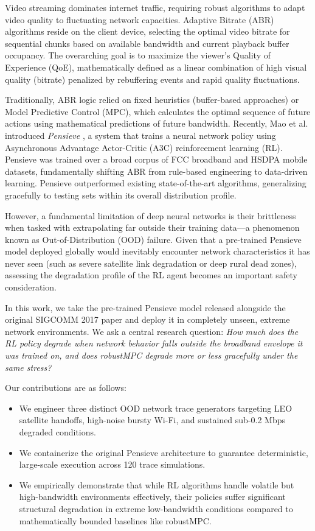 \documentclass[10pt, conference, compsocconf]{IEEEtran}
\begin{document}
Video streaming dominates internet traffic, requiring robust algorithms to adapt video quality to fluctuating network capacities. Adaptive Bitrate (ABR) algorithms reside on the client device, selecting the optimal video bitrate for sequential chunks based on available bandwidth and current playback buffer occupancy. The overarching goal is to maximize the viewer's Quality of Experience (QoE), mathematically defined as a linear combination of high visual quality (bitrate) penalized by rebuffering events and rapid quality fluctuations.

Traditionally, ABR logic relied on fixed heuristics (buffer-based approaches) or Model Predictive Control (MPC), which calculates the optimal sequence of future actions using mathematical predictions of future bandwidth. Recently, Mao et al. introduced \textit{Pensieve} \cite{mao2017neural}, a system that trains a neural network policy using Asynchronous Advantage Actor-Critic (A3C) reinforcement learning (RL). Pensieve was trained over a broad corpus of FCC broadband and HSDPA mobile datasets, fundamentally shifting ABR from rule-based engineering to data-driven learning. Pensieve outperformed existing state-of-the-art algorithms, generalizing gracefully to testing sets within its overall distribution profile.

However, a fundamental limitation of deep neural networks is their brittleness when tasked with extrapolating far outside their training data—a phenomenon known as Out-of-Distribution (OOD) failure. Given that a pre-trained Pensieve model deployed globally would inevitably encounter network characteristics it has never seen (such as severe satellite link degradation or deep rural dead zones), assessing the degradation profile of the RL agent becomes an important safety consideration.

In this work, we take the pre-trained Pensieve model released alongside the original SIGCOMM 2017 paper and deploy it in completely unseen, extreme network environments. We ask a central research question: \textit{How much does the RL policy degrade when network behavior falls outside the broadband envelope it was trained on, and does robustMPC degrade more or less gracefully under the same stress?}

Our contributions are as follows:
\begin{itemize}
    \item We engineer three distinct OOD network trace generators targeting LEO satellite handoffs, high-noise bursty Wi-Fi, and sustained sub-0.2 Mbps degraded conditions.
    \item We containerize the original Pensieve architecture to guarantee deterministic, large-scale execution across 120 trace simulations.
    \item We empirically demonstrate that while RL algorithms handle volatile but high-bandwidth environments effectively, their policies suffer significant structural degradation in extreme low-bandwidth conditions compared to mathematically bounded baselines like robustMPC.
\end{itemize}
\end{document}
